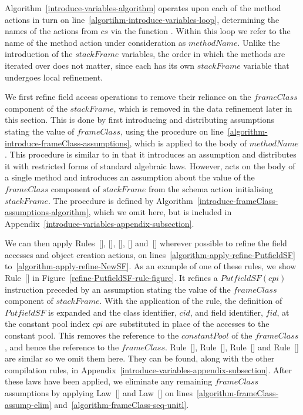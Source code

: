 Algorithm~\ref{introduce-variables-algorithm} operates upon each of
the method actions in turn on
line~\ref{algortihm-introduce-variables-loop}, determining the names
of the actions from $cs$ via the function .
Within this loop we refer to the name of the method action under
consideration as $methodName$.
Unlike the introduction of the $stackFrame$ variables, the order in
which the methods are iterated over does not matter, since each has
its own $stackFrame$ variable that undergoes local refinement.

We first refine field access operations to remove their reliance on
the $frameClass$ component of the $stackFrame$, which is removed in
the data refinement later in this section.
This is done by first introducing and distributing assumptions stating
the value of $frameClass$, using the procedure
 on
line~\ref{algorithm-introduce-frameClass-assumptions}, which is
applied to the body of $methodName$.
This procedure is similar to 
in that it introduces an assumption and distributes it with restricted
forms of standard algebraic laws.
However,  acts on the body of a
single method and introduces an assumption about the value of the
$frameClass$ component of $stackFrame$ from the schema action
initialising $stackFrame$.
The  procedure is defined by
Algorithm~\ref{introduce-frameClass-assumptions-algorithm}, which we
omit here, but is included in
Appendix~\ref{introduce-variables-appendix-subsection}.

We can then apply Rules~[],
[],
[],
[] and~[]
wherever possible to refine the field accesses and object creation
actions, on lines~\ref{algorithm-apply-refine-PutfieldSF}
to~\ref{algorithm-apply-refine-NewSF}.
As an example of one of these rules, we show
Rule~[] in
Figure~\ref{refine-PutfieldSF-rule-figure}.
It refines a $PutfieldSF(cpi)$ instruction preceded by an assumption
stating the value of the $frameClass$ component of $stackFrame$.
With the application of the rule, the definition of $PutfieldSF$ is
expanded and the class identifier, $cid$, and field identifier, $fid$,
at the constant pool index $cpi$ are substituted in place of the
accesses to the constant pool.
This removes the reference to the $constantPool$ of the $frameClass$,
and hence the reference to the $frameClass$.
Rule~[],
Rule~[],
Rule~[] and
Rule~[] are similar so we omit them here.
They can be found, along with the other compilation rules, in
Appendix~\ref{introduce-variables-appendix-subsection}.
After these laws have been applied, we eliminate any remaining
$frameClass$ assumptions by applying Law~[]
and Law~[] on
lines~\ref{algorithm-frameClass-assump-elim}
and~\ref{algorithm-frameClass-seq-unitl}.

